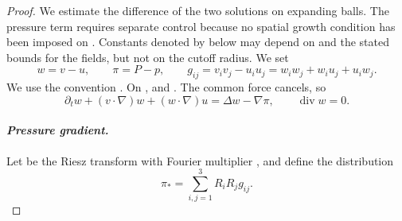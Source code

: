 \begin{proof}
We estimate the difference of the two solutions on expanding balls. The pressure term
requires separate control because no spatial growth condition has been imposed on
. Constants denoted by  below may
depend on  and the stated bounds for the fields, but not on the
cutoff radius. We set
\[
  w=v-u,\qquad
  \pi=P-p,\qquad
  g_{ij}=v_iv_j-u_iu_j=w_iw_j+w_iu_j+u_iw_j.
\]
We use the convention
.
On ,
 and
.
The common force cancels, so
\begin{equation}
  \partial_t w+(v\cdot\nabla)w+(w\cdot\nabla)u
  =\Delta w-\nabla\pi,\qquad \operatorname{div}w=0.
\tag{10.15}\label{eq:10.15}
\end{equation}

\paragraph{\normalfont\itshape Pressure gradient.}
Let  be the Riesz transform with Fourier multiplier
, and define the distribution
\begin{equation}
  \pi_*=\sum_{i,j=1}^3 R_iR_jg_{ij}.
\tag{10.16}\label{eq:10.16}
\end{equation}


\end{proof}
